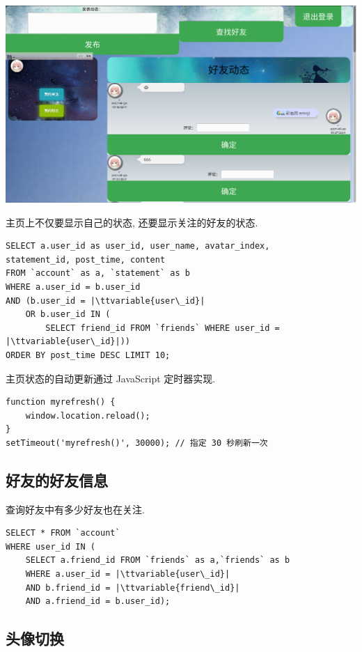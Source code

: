 \documentclass[a4paper,10pt]{article}
\newcommand{\ttvariable}[1]{\texttt{\textit{#1}}}
\begin{document}
\begin{center}
	\includegraphics[scale=0.25]{homepage.png}
\end{center}

主页上不仅要显示自己的状态, 还要显示关注的好友的状态.
\begin{verbatim}
SELECT a.user_id as user_id, user_name, avatar_index,
statement_id, post_time, content
FROM `account` as a, `statement` as b
WHERE a.user_id = b.user_id
AND (b.user_id = |\ttvariable{user\_id}|
    OR b.user_id IN (
        SELECT friend_id FROM `friends` WHERE user_id = |\ttvariable{user\_id}|))
ORDER BY post_time DESC LIMIT 10;
\end{verbatim}

主页状态的自动更新通过 JavaScript 定时器实现.
\begin{verbatim}
function myrefresh() {
    window.location.reload();
}
setTimeout('myrefresh()', 30000); // 指定 30 秒刷新一次
\end{verbatim}

\subsection{好友的好友信息}

查询好友中有多少好友也在关注.
\begin{verbatim}
SELECT * FROM `account`
WHERE user_id IN (
    SELECT a.friend_id FROM `friends` as a,`friends` as b
    WHERE a.user_id = |\ttvariable{user\_id}|
    AND b.friend_id = |\ttvariable{friend\_id}|
    AND a.friend_id = b.user_id);
\end{verbatim}

\subsection{头像切换}
\end{document}

